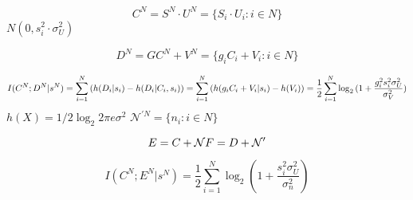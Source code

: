 \begin{equation}
C^N= S^N \cdot U^N = \{ S_i\cdot U_i : i \in N \}
\end{equation}
$N(0, s_i^2 \cdot \sigma^2_U)$

\begin{equation}
D^N= GC^N + V^N = \{ g_i C_i + V_i : i \in N \}
\end{equation}

\begin{equation}
I(C^N; D^N|s^N)  = \sum_{i=1}^N{(h(D_i|s_i)-h(D_i|C_i,s_i))} \\
= \sum_{i=1}^N{(h( g_i C_i + V_i|s_i)-h(V_i))} \\
= \frac{1}{2}\sum_{i=1}^N{\log_2{(1+\frac{g_i^2s_i^2\sigma^2_U}{\sigma^2_V})}}
\end{equation}
$h(X)=1/2\log_2{2\pi e \sigma^2}$
$\mathcal{N}^{\prime N} = \{ n_i : i \in N \} $

\begin{equation}
E = C + \mathcal{N}\\
F = D + \mathcal{N}^{\prime }
\end{equation}

\begin{equation}
I(C^N; E^N|s^N)  = \frac{1}{2}\sum_{i=1}^N{\log_2{(1+\frac{s_i^2\sigma^2_U}{\sigma^2_n})}}
\end{equation}

